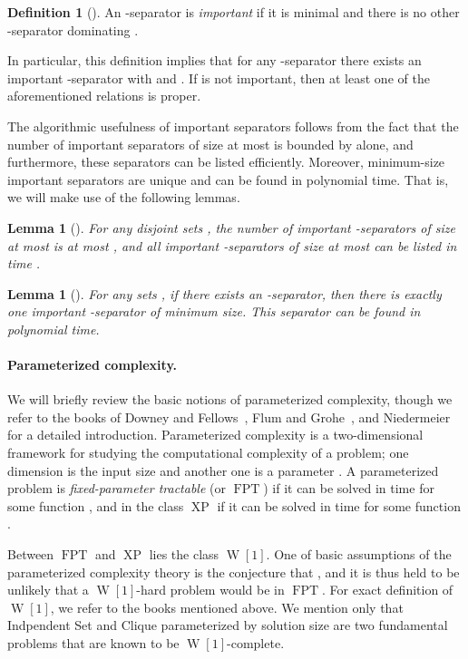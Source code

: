 \documentclass[a4paper,11pt]{article}
\newtheorem{lemma}[theorem]{Lemma}
\theoremstyle{definition}
\newtheorem{definition}[theorem]{Definition}
\theoremstyle{remark}
\DeclareMathOperator{\operatorClassFPT}{FPT}
\newcommand{\classFPT}{\ensuremath{\operatorClassFPT}}
\DeclareMathOperator{\operatorClassW}{W}
\newcommand{\classW}[1]{\ensuremath{\operatorClassW[#1]}}
\DeclareMathOperator{\operatorClassXP}{XP}
\newcommand{\classXP}{\ensuremath{\operatorClassXP}}
\begin{document}
\begin{definition}[\cite{marx2006parameterized}]
An -separator  is \emph{important} if it is minimal and there is no other -separator dominating .
\end{definition}

In particular, this definition implies that for any -separator  there exists an important -separator  with  and . If  is not important, then at least one of the aforementioned relations is proper.

The algorithmic usefulness of important separators follows from the fact that the number of important separators of size at most  is bounded by  alone, and furthermore, these separators can be listed efficiently. Moreover, minimum-size important separators are unique and can be found in polynomial time. That is, we will make use of the following lemmas.

\begin{lemma}[\cite{chen2009improved}]\label{lemma:computing_imp_seps}
For any disjoint sets , the number of important -separators of size at most  is at most , and all important -separators of size at most  can be listed in time .
\end{lemma}

\begin{lemma}[\cite{marx2006parameterized}]\label{lemma:unique_min_sep}
For any sets , if there exists an -separator, then there is exactly one important -separator of minimum size. This separator can be found in polynomial time.
\end{lemma}

\paragraph{Parameterized complexity.} We will briefly review the basic notions of parameterized complexity, though we refer to the books of Downey and Fellows~\cite{DowneyF99}, Flum and Grohe~\cite{FlumG06}, and   Niedermeier~\cite{Niedermeierbook06} for a detailed introduction. 
Parameterized complexity is a two-dimensional framework for studying the computational complexity of a problem; one dimension is the input size
 and another one is a parameter . A parameterized problem is \emph{fixed-parameter tractable} (or \classFPT) if it can be solved in time  for some function , and in the class \classXP{} if it can be solved in time  for some function .

Between \classFPT{} and \classXP{} lies the class \classW{1}. One of basic assumptions of the parameterized complexity theory is the conjecture that , and it is thus held to be unlikely that a \classW{1}-hard problem would be in \classFPT{}. For exact definition of \classW{1}, 
we refer to the books mentioned above.  We mention only that {\sc Indpendent Set} and {\sc Clique}
parameterized by solution size are two fundamental problems that are known to be \classW{1}-complete.
\end{document}
